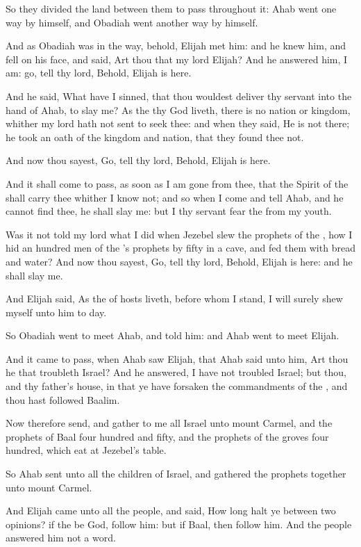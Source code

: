 \Verse So they divided the land between them to pass throughout it: Ahab went one way by himself, and Obadiah went another way by himself.

\Verse And as Obadiah was in the way, behold, Elijah met him: and he knew him, and fell on his face, and said, Art thou that my lord Elijah?  \Verse And he answered him, I am: go, tell thy lord, Behold, Elijah is here.

\Verse And he said, What have I sinned, that thou wouldest deliver thy servant into the hand of Ahab, to slay me?  \Verse As the \LORD thy God liveth, there is no nation or kingdom, whither my lord hath not sent to seek thee: and when they said, He is not there; he took an oath of the kingdom and nation, that they found thee not.

\Verse And now thou sayest, Go, tell thy lord, Behold, Elijah is here.

\Verse And it shall come to pass, as soon as I am gone from thee, that the Spirit of the \LORD shall carry thee whither I know not; and so when I come and tell Ahab, and he cannot find thee, he shall slay me: but I thy servant fear the \LORD from my youth.

\Verse Was it not told my lord what I did when Jezebel slew the prophets of the \LORD, how I hid an hundred men of the \LORD's prophets by fifty in a cave, and fed them with bread and water?  \Verse And now thou sayest, Go, tell thy lord, Behold, Elijah is here: and he shall slay me.

\Verse And Elijah said, As the \LORD of hosts liveth, before whom I stand, I will surely shew myself unto him to day.

\Verse So Obadiah went to meet Ahab, and told him: and Ahab went to meet Elijah.

\Verse And it came to pass, when Ahab saw Elijah, that Ahab said unto him, Art thou he that troubleth Israel?  \Verse And he answered, I have not troubled Israel; but thou, and thy father's house, in that ye have forsaken the commandments of the \LORD, and thou hast followed Baalim.

\Verse Now therefore send, and gather to me all Israel unto mount Carmel, and the prophets of Baal four hundred and fifty, and the prophets of the groves four hundred, which eat at Jezebel's table.

\Verse So Ahab sent unto all the children of Israel, and gathered the prophets together unto mount Carmel.

\Verse And Elijah came unto all the people, and said, How long halt ye between two opinions? if the \LORD be God, follow him: but if Baal, then follow him. And the people answered him not a word.

